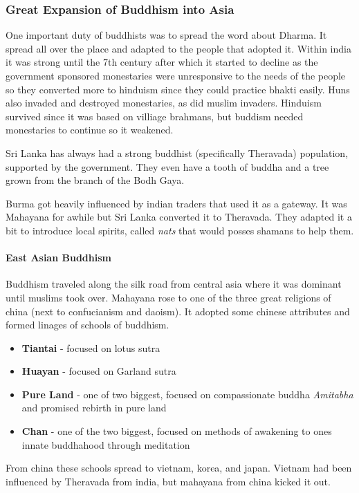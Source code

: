 \documentclass{article}
\begin{document}
\subsubsection{Great Expansion of Buddhism into Asia}
\label{ssub:great_expansion_of_buddhism_into_asia}
One important duty of buddhists was to spread the word about Dharma. It spread all over the place and adapted to the people that adopted it. Within india it was strong until the 7th century after which it started to decline as the government sponsored monestaries were unresponsive to the needs of the people so they converted more to hinduism since they could practice bhakti easily. Huns also invaded and destroyed monestaries, as did muslim invaders. Hinduism survived since it was based on villiage brahmans, but buddism needed monestaries to continue so it weakened.

Sri Lanka has always had a strong buddhist (specifically Theravada) population, supported by the government. They even have a tooth of buddha and a tree grown from the branch of the Bodh Gaya.

Burma got heavily influenced by indian traders that used it as a gateway. It was Mahayana for awhile but Sri Lanka converted it to Theravada. They adapted it a bit to introduce local spirits, called \emph{nats} that would posses shamans to help them.

\paragraph{East Asian Buddhism}
\label{par:east_asian_buddhism}
Buddhism traveled along the silk road from central asia where it was dominant until muslims took over. Mahayana rose to one of the three great religions of china (next to confucianism and daoism). It adopted some chinese attributes and formed linages of schools of buddhism.
\begin{itemize}
	\item \textbf{Tiantai} - focused on lotus sutra
	\item \textbf{Huayan} - focused on Garland sutra
	\item \textbf{Pure Land} - one of two biggest, focused on compassionate buddha \emph{Amitabha} and promised rebirth in pure land
	\item \textbf{Chan} - one of the two biggest, focused on methods of awakening to ones innate buddhahood through meditation
\end{itemize}

From china these schools spread to vietnam, korea, and japan. Vietnam had been influenced by Theravada from india, but mahayana from china kicked it out.
\end{document}
